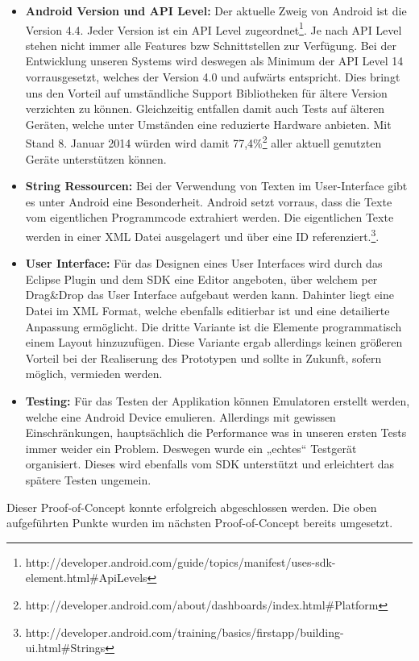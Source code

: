 \begin{itemize}
	\item \textbf{Android Version und API Level:} Der aktuelle Zweig von Android ist die Version 4.4. Jeder Version ist ein API Level zugeordnet\footnote{http://developer.android.com/guide/topics/manifest/uses-sdk-element.html\#ApiLevels}. Je nach API Level stehen nicht immer alle Features bzw Schnittstellen zur Verfügung. Bei der Entwicklung unseren Systems wird deswegen als Minimum der API Level 14 vorrausgesetzt, welches der Version 4.0 und aufwärts entspricht. Dies bringt uns den Vorteil auf umständliche Support Bibliotheken für ältere Version verzichten zu können. Gleichzeitig entfallen damit auch Tests auf älteren Geräten, welche unter Umständen eine reduzierte Hardware anbieten. Mit Stand 8. Januar 2014 würden wird damit 77,4\%\footnote{http://developer.android.com/about/dashboards/index.html\#Platform} aller aktuell genutzten Geräte unterstützen können.
	\item \textbf{String Ressourcen:} Bei der Verwendung von Texten im User-Interface gibt es unter Android eine Besonderheit. Android setzt vorraus, dass die Texte vom eigentlichen Programmcode extrahiert werden. Die eigentlichen Texte werden in einer XML Datei ausgelagert und über eine ID referenziert.\footnote{http://developer.android.com/training/basics/firstapp/building-ui.html\#Strings}.
	\item \textbf{User Interface:} Für das Designen eines User Interfaces wird durch das Eclipse Plugin und dem SDK eine Editor angeboten, über welchem per Drag\&Drop das User Interface aufgebaut werden kann. Dahinter liegt eine Datei im XML Format, welche ebenfalls editierbar ist und eine detailierte Anpassung ermöglicht. Die dritte Variante ist die Elemente programmatisch einem Layout hinzuzufügen. Diese Variante ergab allerdings keinen größeren Vorteil bei der Realiserung des Prototypen und sollte in Zukunft, sofern möglich, vermieden werden.
	\item \textbf{Testing:} Für das Testen der Applikation können Emulatoren erstellt werden, welche eine Android Device emulieren. Allerdings mit gewissen Einschränkungen, hauptsächlich die Performance was in unseren ersten Tests immer weider ein Problem. Deswegen wurde ein „echtes“ Testgerät organisiert. Dieses wird ebenfalls vom SDK unterstützt und erleichtert das spätere Testen ungemein.
\end{itemize}


Dieser Proof-of-Concept konnte erfolgreich abgeschlossen werden. Die oben aufgeführten Punkte wurden im nächsten Proof-of-Concept bereits umgesetzt.

